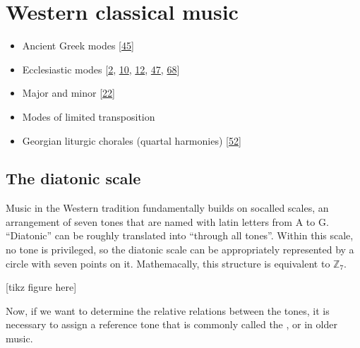 \documentclass[letterpaper,10pt,english]{sphinxmanual}
\begin{document}
\section{Western classical music}
\label{\detokenize{2_scales_modes:western-classical-music}}\begin{itemize}
\item {} 
\sphinxAtStartPar
Ancient Greek modes {[}\hyperlink{cite.8_bibliography:id55}{45}{]}

\item {} 
\sphinxAtStartPar
Ecclesiastic modes {[}\hyperlink{cite.8_bibliography:id58}{2}, \hyperlink{cite.8_bibliography:id66}{10}, \hyperlink{cite.8_bibliography:id67}{12}, \hyperlink{cite.8_bibliography:id68}{47}, \hyperlink{cite.8_bibliography:id57}{68}{]}

\item {} 
\sphinxAtStartPar
Major and minor {[}\hyperlink{cite.8_bibliography:id74}{22}{]}

\item {} 
\sphinxAtStartPar
Modes of limited transposition

\item {} 
\sphinxAtStartPar
Georgian liturgic chorales (quartal harmonies) {[}\hyperlink{cite.8_bibliography:id20}{52}{]}

\end{itemize}


\subsection{The diatonic scale}
\label{\detokenize{2_scales_modes:the-diatonic-scale}}
\sphinxAtStartPar
Music in the Western tradition fundamentally builds on
so\sphinxhyphen{}called  scales, an arrangement of seven tones
that are named with latin letters from A to G. “Diatonic” can
be roughly translated into “through all tones”. Within this scale,
no tone is privileged, so the diatonic scale can be appropriately
represented by a circle with seven points on it. Mathemacally,
this structure is equivalent to \(\mathbb{Z}_7\).

\sphinxAtStartPar
{[}tikz figure here{]}

\sphinxAtStartPar
Now, if we want to determine the relative relations between the tones,
it is necessary to assign a reference tone that is commonly called the ,
or  in older music.
\end{document}
